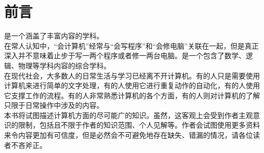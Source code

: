 \chapter*{前言}\label{ch:Preface}
    \cst 是一个涵盖了丰富内容的学科。\\
    在常人认知中，“会计算机”经常与“会写程序”和“会修电脑”关联在一起，但是真正深入\cst 并不意味着止步于写一两个程序或者修一两台电脑。\cst 是一个包含了数学、逻辑、物理等学科内容的综合学科。\\
    在现代社会，大多数人的日常生活与学习已经离不开计算机。有的人只是需要使用计算机来进行简单的文字处理，有的人使用它进行重复动作的自动化，有的人使用它支撑工作的流程。有的人非常熟悉计算机的各个方面，有的人则对计算机的了解只限于日常操作中涉及的内容。\\
    本书将试图描述计算机方面的尽可能广的知识。虽然，这客观上会受到作者主观意识的限制，包括且不限于作者的知识范围、个人见解等。作者会试图使用更多资料来令内容更加有可信度，但是必然会不可避免地存在缺失、错漏的情况，请各位读者不吝斧正。\\
